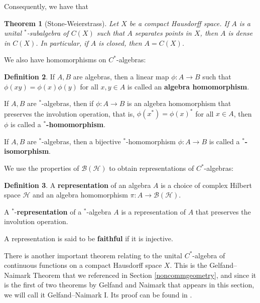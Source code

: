 \documentclass{article}
\theoremstyle{plain}
\newtheorem{theorem}{Theorem}[section]
\theoremstyle{definition}
\newtheorem{definition}[theorem]{Definition}
\theoremstyle{remark}
\begin{document}
Consequently, we have that

\begin{theorem}[Stone-Weierstrass]
	\label{stoneweierstrass}
	Let $X$ be a compact Hausdorff space.
	If $A$ is a unital $^*$-subalgebra of $C(X)$ 
	such that $A$ separates points in $X$, then $A$ is dense in $C(X)$.
	In particular, if $A$ is closed, then $A = C(X)$.
\end{theorem}

We also have homomorphisms on $C^*$-algebras:

\begin{definition}
	If $A, B$ are algebras, then a linear map $\phi : A \rightarrow B$ such that
	$\phi(xy) = \phi(x)\phi(y)$ for all $x,y \in A$ is called an \textbf{algebra homomorphism}.

	If $A, B$ are $\bm{^*}$-algebras, then if $\phi : A \rightarrow B$ is an algebra homomorphism that preserves the involution operation,
	that is, $\phi(x^*) = \phi(x)^*$ for all $x \in A$, then $\phi$ is called a $\bm{^*}$\textbf{-homomorphism}.

	If $A, B$ are $\bm{^*}$-algebras, then 
	a bijective $^*$-homomorphism
	$\phi : A \rightarrow B$
	is called a $\bm{^*}$\textbf{-isomorphism}.
\end{definition}

We use the properties of $\mathcal{B}(\mathcal{H})$ 
to obtain representations of
$C^*$-algebras:

\begin{definition}
	A \textbf{representation} of an algebra $A$ is a choice of complex Hilbert space
	$\mathcal{H}$ and an algebra homomorphism
	$\pi : A \rightarrow \mathcal{B}(\mathcal{H})$.

	A $\bm{^*}$-\textbf{representation} of a $^*$-algebra $A$
	is a representation of $A$ that preserves the involution operation.

	A representation is said to be \textbf{faithful} if it is injective.
\end{definition}

There is another important theorem relating to 
the unital $C^*$-algebra of continuous functions on a compact Hausdorff space $X$.
This is the Gelfand--Naimark Theorem that we referenced in Section \ref{noncommgeometry},
and
since it is the first
of two theorems by Gelfand and Naimark that appears in this section, 
we will call it Gelfand--Naimark I.
Its proof can be found in \citet[Theorem II.2.2.4]{blackadar2006operator}.
\end{document}
